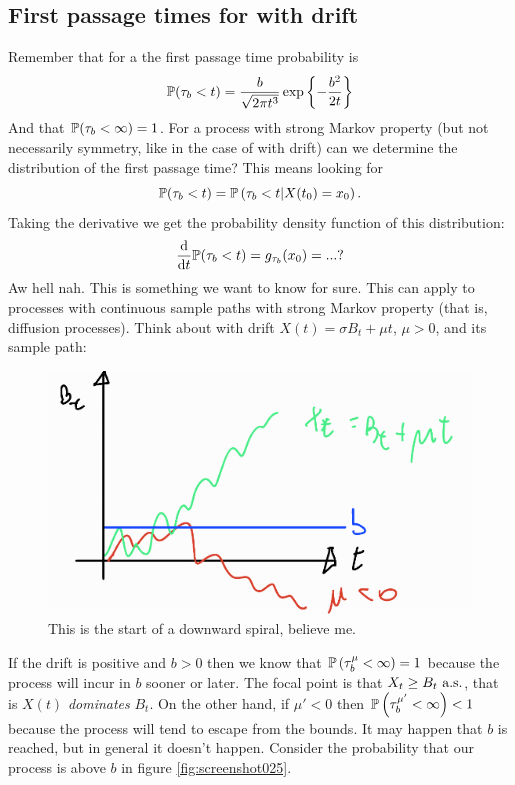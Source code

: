 \documentclass[12pt]{report}
\begin{document}
\subsection{First passage times for \bwm{} with drift}
Remember that for a \bwm{} the first passage time probability is 
\begin{equation*}
	\mathbb{P}(\tau_{b}<t)=\frac{b}{\sqrt{2\pi t^{3}}}\exp\left\{-\frac{b^{2}}{2t}\right\}
\end{equation*}
And that $\mathbb{P}(\tau_{b}<\infty)=1$.
For a process with strong Markov property (but not necessarily symmetry, like in the case of \bwm{} with drift) can we determine the distribution of the first passage time? This means looking for
\begin{equation*}
	\mathbb{P}(\tau_{b}<t)=\mathbb{P}\left(\tau_{b}<t|X(t_{0})=x_{0}\right).
\end{equation*}
Taking the derivative we get the probability density function of this distribution:
\begin{equation*}
	\frac{\mathop{}\!\mathrm{d}}{\mathop{}\!\mathrm{d} t}\mathbb{P}(\tau_{b}<t)=g_{\tau_{b}}({x_{0}})=...?
\end{equation*}
Aw hell nah. This is something we want to know for sure. 
This can apply to processes with continuous sample paths with strong Markov property (that is, diffusion processes). Think about \bwm{} with drift $X(t)=\sigma B_{t}+\mu t$, $\mu>0$, and its sample path:
\begin{figure}[H]
	\centering
	\includegraphics[width=0.5\linewidth]{img/screenshot024}
	\caption{This is the start of a downward spiral, believe me.}
	\label{fig:screenshot024}
\end{figure}
If the drift is positive and $b>0$ then we know that $\mathbb{P}\left(\tau^{\mu}_{b}<\infty\right)=1$ because the process will incur in $b$ sooner or later. The focal point is that $X_{t}\geq B_{t}\text{ a.s.}$, that is $X(t)$ \textit{dominates} $B_{t}$. On the other hand, if $\mu'<0$ then $\mathbb{P}\left(\tau^{\mu'}_{b}<\infty\right)<1$ because the process will tend to escape from the bounds. It may happen that $b$ is reached, but in general it doesn't happen. Consider the probability that our process is above $b$ in figure \ref{fig:screenshot025}.
\end{document}
